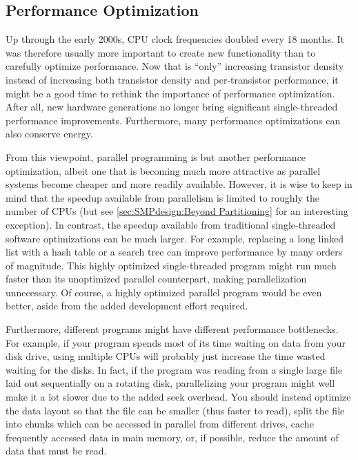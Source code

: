\subsection{Performance Optimization}
\label{sec:intro:Performance Optimization}

Up through the early 2000s, CPU clock frequencies doubled every 18 months.
It was therefore usually more important to create new functionality than to
carefully optimize performance.
Now that  is ``only'' increasing transistor density instead
of increasing both transistor density and per-transistor performance,
it might be a good time to rethink the importance of performance
optimization.
After all, new hardware generations no longer bring significant
single-threaded performance improvements.
Furthermore, many performance optimizations can also conserve energy.

From this viewpoint, parallel programming is but another performance
optimization, albeit one that is becoming much more attractive
as parallel systems become cheaper and more readily available.
However, it is wise to keep in mind that the speedup available from
parallelism is limited to roughly the number of CPUs
(but see \cref{sec:SMPdesign:Beyond Partitioning}
for an interesting exception).
In contrast, the speedup available from traditional single-threaded
software optimizations can be much larger.
For example, replacing a long linked list with a hash table
or a search tree can improve performance by many orders of magnitude.
This highly optimized single-threaded program might run much
faster than its unoptimized parallel counterpart, making parallelization
unnecessary.
Of course, a highly optimized parallel program would be even better,
aside from the added development effort required.

Furthermore, different programs might have different performance
bottlenecks.
For example, if your program spends most of its time
waiting on data from your disk drive,
using multiple CPUs will probably just increase the time wasted waiting
for the disks.
In fact, if the program was reading from a single large file laid out
sequentially on a rotating disk, parallelizing your program might
well make it a lot slower due to the added seek overhead.
You should instead optimize the data layout so that
the file can be smaller (thus faster to read), split the file into chunks
which can be accessed in parallel from different drives,
cache frequently accessed data in main memory,
or, if possible,
reduce the amount of data that must be read.

